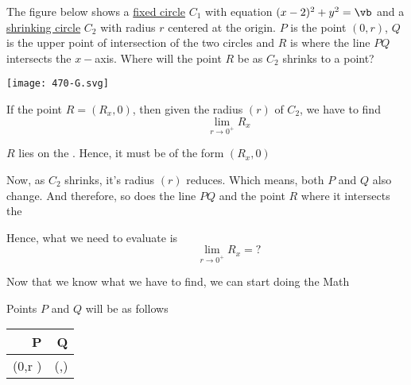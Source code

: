 \documentclass[14pt,fleqn]{extarticle}
\newcommand\va{2}
\newcommand\limit{\lim_{r\to 0^+}}
\newcommand\xq{\frac{r^2}{4}}
\newcommand\yq{\frac{r}{4}\sqrt{16-r^2}}
\begin{document}
 

\begin{problem}
	\statement 

The figure below shows a \underline{fixed circle} $C_1$ with equation $(x-\va)^2 + y^2 = \vb$ and a \underline{shrinking circle} $C_2$ with radius $r$ centered at the origin. $P$ is the point $(0,r)$, $Q$ is the upper point of intersection of the two circles and $R$ is where the line $PQ$ intersects the $x-$axis. Where will the point $R$ be as $C_2$ shrinks to a point? 

\begin{center}
\texttt{[image: 470-G.svg]}
\end{center}

\begin{step}
  \begin{options} 
     \correct 
      
     If the point $R = \left(R_x,0 \right)$, then given the radius $(r)$ of $C_2$, we have to find 
     \[ \qquad\qquad \limit R_x \]
        
    \end{options} 
     \reason 
     
     $R$ lies on the \xaxis. Hence, it must be of the form $\left(R_x,0 \right)$ \newline
     
     Now, as $C_2$ shrinks, it's radius $(r)$ reduces. Which means, both $P$ and $Q$ also change. And therefore, so does the line $PQ$ and the point $R$ where it intersects the \xaxis \newline 
     
     Hence, what we need to evaluate is 
     \[ \qquad\qquad \limit R_x = ? \]
     
     Now that we know what we have to find, we can start doing the Math  
\end{step}
          
\begin{step}
  \begin{options} 
     \correct 
      
      Points $P$ and $Q$ will be as follows 
      
      \begin{center}
  \begin{tabular}{NN}
   \toprule
        P & Q \\
   \midrule 
   \left(0,r \right) & \left(\xq,\yq \right) \\
    \bottomrule
  \end{tabular}
\end{center}
       

\end{options}
\end{step}
\end{problem}
\end{document}
